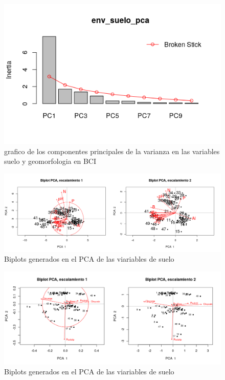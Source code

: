 \documentclass[11pt,]{article}
\begin{document}
\begin{figure}
\centering
\includegraphics{env_suelo_pca.png}
\caption{grafico de los componentes principales de la varianza en las
variables suelo y geomorfologia en BCI \label{fig:env_suelo_pca}}
\end{figure}

\begin{figure}
\centering
\includegraphics[width=1.00000\textwidth]{Biplot_PCA_escalamiento_actualizado.png}
\caption{Biplots generados en el PCA de las viariables de suelo
\label{fig:Biplot_PCA_escalamiento}}
\end{figure}

\begin{figure}
\centering
\includegraphics[width=1.00000\textwidth]{PCA_comunidad_actualizado.png}
\caption{Biplots generados en el PCA de las viariables de suelo
\label{fig:PCA_comunidad}}
\end{figure}
\end{document}
